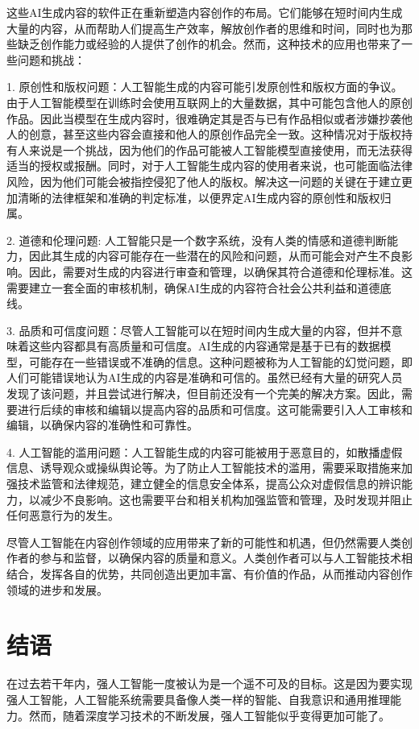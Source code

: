 这些AI生成内容的软件正在重新塑造内容创作的布局。它们能够在短时间内生成大量的内容，从而帮助人们提高生产效率，解放创作者的思维和时间，同时也为那些缺乏创作能力或经验的人提供了创作的机会。然而，这种技术的应用也带来了一些问题和挑战：

1. 原创性和版权问题：人工智能生成的内容可能引发原创性和版权方面的争议。由于人工智能模型在训练时会使用互联网上的大量数据，其中可能包含他人的原创作品。因此当模型在生成内容时，很难确定其是否与已有作品相似或者涉嫌抄袭他人的创意，甚至这些内容会直接和他人的原创作品完全一致。这种情况对于版权持有人来说是一个挑战，因为他们的作品可能被人工智能模型直接使用，而无法获得适当的授权或报酬。同时，对于人工智能生成内容的使用者来说，也可能面临法律风险，因为他们可能会被指控侵犯了他人的版权。解决这一问题的关键在于建立更加清晰的法律框架和准确的判定标准，以便界定AI生成内容的原创性和版权归属。

2. 道德和伦理问题: 人工智能只是一个数字系统，没有人类的情感和道德判断能力，因此其生成的内容可能存在一些潜在的风险和问题，从而可能会对产生不良影响。因此，需要对生成的内容进行审查和管理，以确保其符合道德和伦理标准。这需要建立一套全面的审核机制，确保AI生成的内容符合社会公共利益和道德底线。

3. 品质和可信度问题：尽管人工智能可以在短时间内生成大量的内容，但并不意味着这些内容都具有高质量和可信度。AI生成的内容通常是基于已有的数据模型，可能存在一些错误或不准确的信息。这种问题被称为人工智能的幻觉问题，即人们可能错误地认为AI生成的内容是准确和可信的。虽然已经有大量的研究人员发现了该问题，并且尝试进行解决，但目前还没有一个完美的解决方案。因此，需要进行后续的审核和编辑以提高内容的品质和可信度。这可能需要引入人工审核和编辑，以确保内容的准确性和可靠性。

4. 人工智能的滥用问题：人工智能生成的内容可能被用于恶意目的，如散播虚假信息、诱导观众或操纵舆论等。为了防止人工智能技术的滥用，需要采取措施来加强技术监管和法律规范，建立健全的信息安全体系，提高公众对虚假信息的辨识能力，以减少不良影响。这也需要平台和相关机构加强监管和管理，及时发现并阻止任何恶意行为的发生。

尽管人工智能在内容创作领域的应用带来了新的可能性和机遇，但仍然需要人类创作者的参与和监督，以确保内容的质量和意义。人类创作者可以与人工智能技术相结合，发挥各自的优势，共同创造出更加丰富、有价值的作品，从而推动内容创作领域的进步和发展。

\section{结语}

在过去若干年内，强人工智能一度被认为是一个遥不可及的目标。这是因为要实现强人工智能，人工智能系统需要具备像人类一样的智能、自我意识和通用推理能力。然而，随着深度学习技术的不断发展，强人工智能似乎变得更加可能了。

